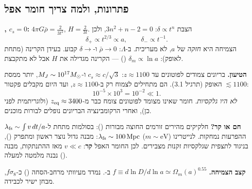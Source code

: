 \subsection{פתרונות, ולמה צריך חומר אפל}
\begin{keybox}
\textbf{, $c_s=0$:} $4\pi G\bar\rho=\frac{2}{3t^2}$, $H=\frac{2}{3t}$. הצבת $\delta\propto t^n$: $3n^2+n-2=0$, ולכן
\begin{equation}
\delta_+\propto t^{2/3}\propto a,\qquad \delta_-\propto t^{-1}.
\end{equation}
הצמיחה היא \emph{חזקה} של $a$, לא מעריכית. ב-$\Lambda$: $\bar\rho\to0$ ו-$\delta\to$ קבוע. בעידן הקרינה (מתחת לאופק): $\delta_m\propto\ln a$ () --- הקרינה מגדילה את $H$ אבל לא מתקבצת.
\end{keybox}
\textbf{הטיעון.} בריונים צמודים לפוטונים עד $z\approx1100$: $c_s\approx c/\sqrt3$ ו-$M_J\sim10^{17}M_{\odot}$, יותר ממסת האופק (תרגיל 3.1). הם מתחילים לצמוח רק ב-$z\approx1100$, ועד היום מקבלים פקטור $\lesssim1100$:
\begin{equation}
10^{-5}\times10^{3}=10^{-2}\ll1 .
\end{equation}
\emph{לא היו גלקסיות.} חומר שאינו מצומד לפוטונים צומח כבר מ-$z_{\rm eq}\approx3400$ (ולוגריתמית לפני כן), ואחרי הרקומבינציה הבריונים נופלים לבורות מוכנים.

\textbf{חם או קר?} חלקיקים מהירים זורמים החוצה מבורות (): בסולמות מתחת ל-$\lambda_{\rm fs}\sim\int v\,dt/a$ ההפרעות נמחקות. לנייטרינו ($m\sim\mathrm{eV}$) $\lambda_{\rm fs}\sim100\,\mathrm{Mpc}$: מבנה גדול נוצר ראשון ומתפרק (), בניגוד לתצפית שגלקסיות זקנות מצבירים. לכן החומר האפל \textbf{קר}: $v\ll c$ מאז ההתנתקות, מבנה נבנה מלמטה למעלה ().

\textbf{קצב הצמיחה.} $f\equiv d\ln D/d\ln a\simeq\Omega_m(a)^{0.55}$ ב-. נמדד מעיוותי מרחב-הסחה () כ-$f\sigma_8$, מבחן ישיר לכבידה.

